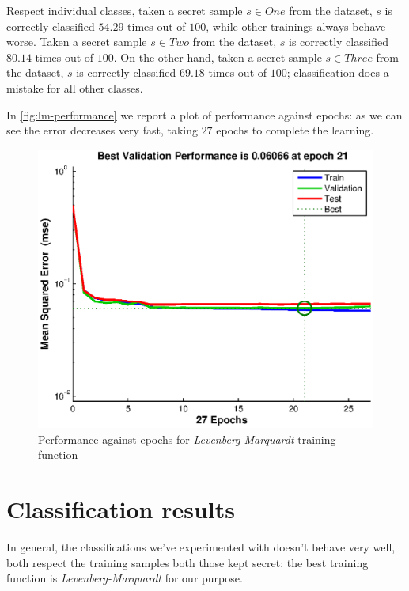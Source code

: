 \documentclass[10pt,a4paper]{article}
\begin{document}
    Respect individual classes, taken a secret sample $s \in One$ from the dataset, 
    $s$ is correctly classified $54.29$ times out of $100$, while other trainings always behave worse. 
    Taken a secret sample $s \in Two$ from the dataset, $s$ is correctly classified $80.14$ times out of $100$. 
    On the other hand, taken a secret sample $s \in Three$ from the dataset, $s$ is correctly classified $69.18$ times out of $100$;
    classification does a mistake for all other classes.

    In \autoref{fig:lm-performance} we report a plot of performance against epochs: as we can
    see the error decreases very fast, taking $27$ epochs to complete the learning.

    \begin{figure}
    \centering
    \includegraphics[scale=0.7]{eps/lm-performance.eps}
    \caption{Performance against epochs for \emph{Levenberg-Marquardt} training function}
    \label{fig:lm-performance}
    \end{figure}

    \section{Classification results}
    
    In general, the classifications we've experimented with doesn't behave very
    well, both respect the training samples both those kept secret: the 
    best training function is \emph{Levenberg-Marquardt} for our purpose.
\end{document}
